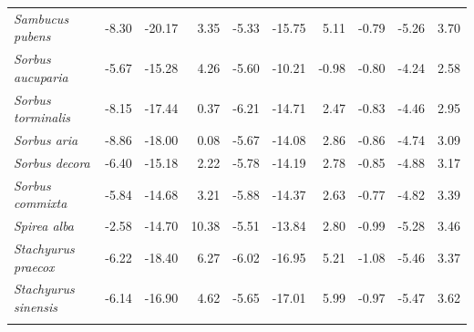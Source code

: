 \documentclass[11pt]{article}
\begin{document}
\begin{longtable}{lrrrrrrrrr}
  \emph{Sambucus pubens} & -8.30 & -20.17 & 3.35 & -5.33 & -15.75 & 5.11 & -0.79 & -5.26 & 3.70 \\ 
  \emph{Sorbus aucuparia} & -5.67 & -15.28 & 4.26 & -5.60 & -10.21 & -0.98 & -0.80 & -4.24 & 2.58 \\ 
  \emph{Sorbus torminalis} & -8.15 & -17.44 & 0.37 & -6.21 & -14.71 & 2.47 & -0.83 & -4.46 & 2.95 \\ 
  \emph{Sorbus aria} & -8.86 & -18.00 & 0.08 & -5.67 & -14.08 & 2.86 & -0.86 & -4.74 & 3.09 \\ 
  \emph{Sorbus decora} & -6.40 & -15.18 & 2.22 & -5.78 & -14.19 & 2.78 & -0.85 & -4.88 & 3.17 \\ 
  \emph{Sorbus commixta} & -5.84 & -14.68 & 3.21 & -5.88 & -14.37 & 2.63 & -0.77 & -4.82 & 3.39 \\ 
  \emph{Spirea alba} & -2.58 & -14.70 & 10.38 & -5.51 & -13.84 & 2.80 & -0.99 & -5.28 & 3.46 \\ 
  \emph{Stachyurus praecox} & -6.22 & -18.40 & 6.27 & -6.02 & -16.95 & 5.21 & -1.08 & -5.46 & 3.37 \\ 
  \emph{Stachyurus sinensis} & -6.14 & -16.90 & 4.62 & -5.65 & -17.01 & 5.99 & -0.97 & -5.47 & 3.62 \\ 
  \hline
\label{tab:tablesupp3}
\end{longtable}
\endgroup \clearpage \pagebreak 
\begingroup\footnotesize
\end{document}
